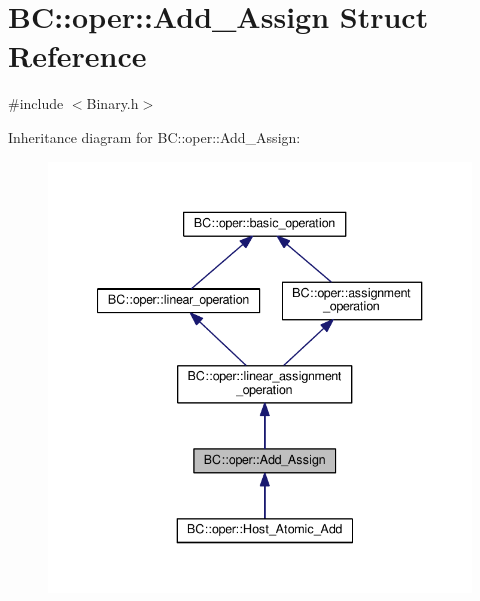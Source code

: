\hypertarget{structBC_1_1oper_1_1Add__Assign}{}\section{BC\+:\+:oper\+:\+:Add\+\_\+\+Assign Struct Reference}
\label{structBC_1_1oper_1_1Add__Assign}


{\ttfamily \#include $<$Binary.\+h$>$}



Inheritance diagram for BC\+:\+:oper\+:\+:Add\+\_\+\+Assign\+:
\nopagebreak
\begin{figure}[H]
\begin{center}
\leavevmode
\includegraphics[width=340pt]{structBC_1_1oper_1_1Add__Assign__inherit__graph}
\end{center}
\end{figure}


